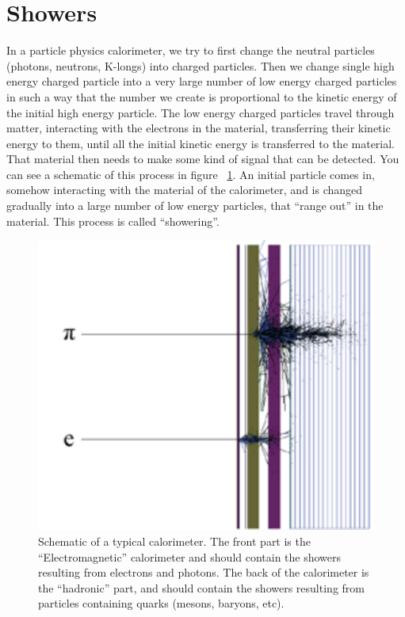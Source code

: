 \;
\;

\section{Showers}

\noindent
In a particle physics calorimeter, we try to first change the neutral particles (photons, neutrons, K-longs) into charged particles. Then we change single high energy charged particle into a very large number of low energy charged particles in such a way that the number we create is proportional to the kinetic energy of the initial high energy particle. The low energy charged particles travel through matter, interacting with the electrons in the material, transferring their kinetic energy to them, until all the initial kinetic energy is transferred to the material. That material then needs to make some kind of signal that can be detected. You can see a schematic of this process in figure ~\ref{fig:cal1}. An initial particle comes in, somehow interacting with the material of the calorimeter, and is changed gradually into a large number of low energy particles, that ``range out'' in the material. This process is called ``showering''.

\;
\;

\begin{figure}[h]
\centering\includegraphics[scale=1.0]{./calorimetry/Pictures/fig1.pdf}
\caption{Schematic of a typical calorimeter. The front part is the ``Electromagnetic'' calorimeter and should contain the showers resulting from electrons and photons. The back of the calorimeter is the ``hadronic'' part, and should contain the showers resulting from particles containing quarks (mesons, baryons, etc).}
\label{fig:cal1}
\end{figure}

